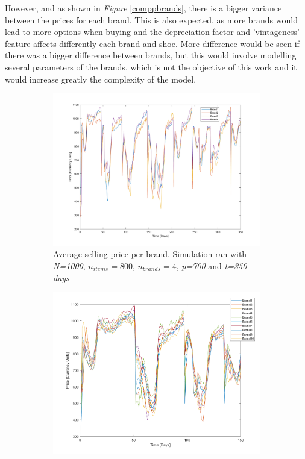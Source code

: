 \documentclass[12pt]{article}
\begin{document}
However, and as shown in \textit{Figure} \ref{comppbrands}, there is a bigger variance between the prices for each brand. This is also expected, as more brands would lead to more options when buying and the depreciation factor and 'vintageness' feature affects differently each brand and shoe. More difference would be seen if there was a bigger difference between brands, but this would involve modelling several parameters of the brands, which is not the objective of this work and it would increase greatly the complexity of the model.

\begin{figure}
\begin{subfigure}{0.5\textwidth}
    \centering
    \includegraphics[width=\textwidth]{Nominal_Out/brndpnom.png}
    \caption{Average selling price per brand. Simulation ran with \textit{N=1000}, \textit{$n_{items}=800$}, \textit{$n_{brands}=4$}, \textit{p=700} and \textit{t=350 days}}
\end{subfigure}
\begin{subfigure}{0.5\textwidth}
      \centering
    \includegraphics[width=\textwidth]{Brands/Brnd-hbrands.png}

\end{subfigure}
\end{figure}
\end{document}
